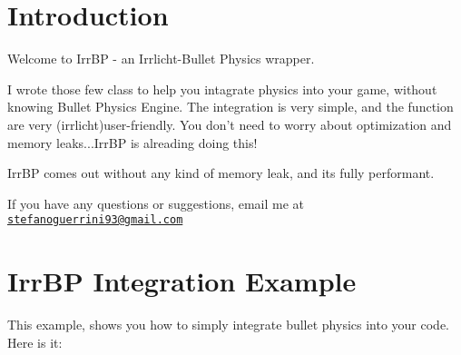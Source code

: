 \hypertarget{index_intro}{}\section{Introduction}\label{index_intro}
Welcome to IrrBP -\/ an Irrlicht-\/Bullet Physics wrapper.

I wrote those few class to help you intagrate physics into your game, without knowing Bullet Physics Engine. The integration is very simple, and the function are very (irrlicht)user-\/friendly. You don't need to worry about optimization and memory leaks...IrrBP is alreading doing this!

IrrBP comes out without any kind of memory leak, and its fully performant.

If you have any questions or suggestions, email me at \href{mailto:stefanoguerrini93@gmail.com}{\tt stefanoguerrini93@gmail.com}\hypertarget{index_IrrBPexample}{}\section{IrrBP Integration Example}\label{index_IrrBPexample}
This example, shows you how to simply integrate bullet physics into your code. Here is it:



